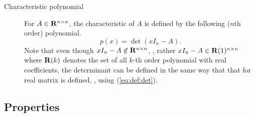 \begin{description}

\item [Characteristic polynomial] For $A\in\mathbf{R}^{n\times n}$, the characteristic
of $A$ is defined by the following ($n$th order) polynomial.
\begin{equation}
\label{eq:char-poly}
p(x) = \det(xI_n - A).
\end{equation}
Note that even though $xI_n-A \not\in\mathbf{R}^{n\times n}$,
\ie, rather $xI_n -A \in \mathbf{R}(1)^{n\times n}$
where $\mathbf{R}(k)$ denotes the set of all $k$-th order polynomial with real coefficients,
the determinant can be defined in the same way that that for real matrix is defined,
\eg, using (\ref{eq:def:det}).

\end{description}


\subsection{Properties}

